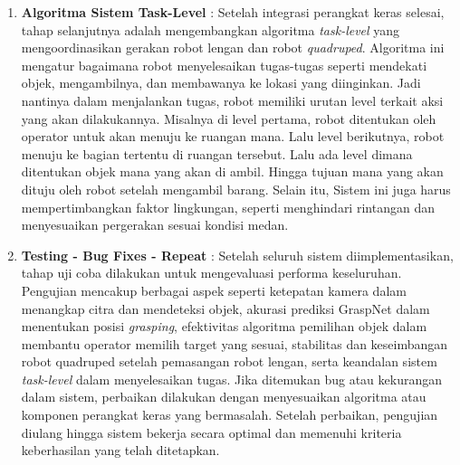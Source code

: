 \begin{enumerate}
  \item \textbf{Algoritma Sistem Task-Level} : Setelah integrasi perangkat keras selesai, tahap selanjutnya adalah
  mengembangkan algoritma \emph{task-level} yang mengoordinasikan gerakan robot lengan dan robot \emph{quadruped}.
  Algoritma ini mengatur bagaimana robot menyelesaikan tugas-tugas seperti mendekati objek, mengambilnya, dan
  membawanya ke lokasi yang diinginkan. Jadi nantinya dalam menjalankan tugas, robot memiliki urutan level terkait aksi yang akan dilakukannya.
  Misalnya di level pertama, robot ditentukan oleh operator untuk akan menuju ke ruangan mana. 
  Lalu level berikutnya, robot menuju ke bagian tertentu di ruangan tersebut. Lalu ada level dimana ditentukan objek mana yang akan di ambil.
  Hingga tujuan mana yang akan dituju oleh robot setelah mengambil barang. Selain itu,
   Sistem ini juga harus mempertimbangkan faktor lingkungan, seperti menghindari
  rintangan dan menyesuaikan pergerakan sesuai kondisi medan.

  \item \textbf{Testing - Bug Fixes - Repeat} : Setelah seluruh sistem diimplementasikan, tahap uji coba dilakukan
  untuk mengevaluasi performa keseluruhan. Pengujian mencakup berbagai aspek seperti ketepatan kamera dalam menangkap
  citra dan mendeteksi objek, akurasi prediksi GraspNet dalam menentukan posisi \emph{grasping}, efektivitas algoritma
  pemilihan objek dalam membantu operator memilih target yang sesuai, stabilitas dan keseimbangan robot quadruped setelah
  pemasangan robot lengan, serta keandalan sistem \emph{task-level} dalam menyelesaikan tugas. Jika ditemukan bug atau
  kekurangan dalam sistem, perbaikan dilakukan dengan menyesuaikan algoritma atau komponen perangkat keras yang bermasalah.
  Setelah perbaikan, pengujian diulang hingga sistem bekerja secara optimal dan memenuhi kriteria keberhasilan yang telah ditetapkan.
  
\end{enumerate}